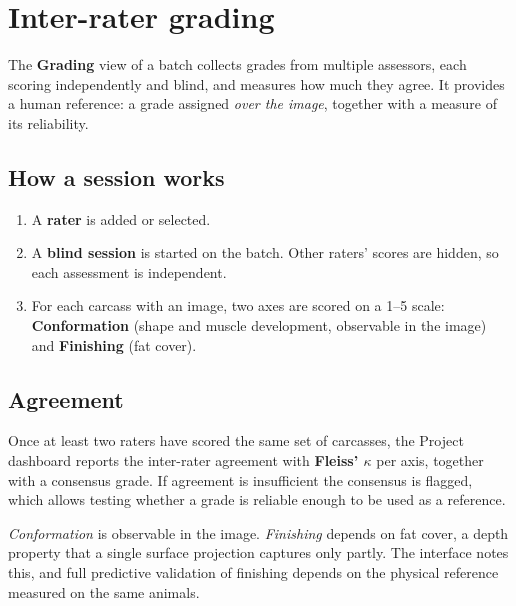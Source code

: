 \chapter{Inter-rater grading}


\vspace{4pt}
The \textbf{Grading} view of a batch collects grades from multiple assessors, each
scoring independently and blind, and measures how much they agree. It provides a
human reference: a grade assigned \emph{over the image}, together with a measure of
its reliability.

\section{How a session works}

\begin{enumerate}[leftmargin=1.4em,itemsep=3pt]
  \item A \textbf{rater} is added or selected.
  \item A \textbf{blind session} is started on the batch. Other raters' scores are
        hidden, so each assessment is independent.
  \item For each carcass with an image, two axes are scored on a 1--5 scale:
        \textbf{Conformation} (shape and muscle development, observable in the
        image) and \textbf{Finishing} (fat cover).
\end{enumerate}

\section{Agreement}

Once at least two raters have scored the same set of carcasses, the Project
dashboard reports the inter-rater agreement with \textbf{Fleiss' $\kappa$} per
axis, together with a consensus grade. If agreement is insufficient the consensus
is flagged, which allows testing whether a grade is reliable enough to be used as
a reference.

\begin{note}[title={Two axes, two different confidences}]
\emph{Conformation} is observable in the image. \emph{Finishing} depends on fat
cover, a depth property that a single surface projection captures only partly.
The interface notes this, and full predictive validation of finishing depends on
the physical reference measured on the same animals.
\end{note}
